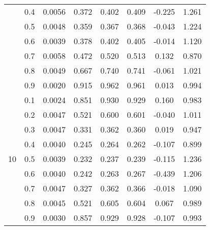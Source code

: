 \documentclass[11pt,a4paper]{report}
\begin{document}
\begin{longtable}{ | c | c || c | c | c | c | c | c | }
 & 0.4 & 0.0056 & 0.372 & 0.402 & 0.409 & -0.225 & 1.261 \\
 & 0.5 & 0.0048 & 0.359 & 0.367 & 0.368 & -0.043 & 1.224 \\
 & 0.6 & 0.0039 & 0.378 & 0.402 & 0.405 & -0.014 & 1.120 \\
 & 0.7 & 0.0058 & 0.472 & 0.520 & 0.513 & 0.132 & 0.870 \\
 & 0.8 & 0.0049 & 0.667 & 0.740 & 0.741 & -0.061 & 1.021 \\
 & 0.9 & 0.0020 & 0.915 & 0.962 & 0.961 & 0.013 & 0.994 \\
 \hline
\multirow{9}{*}{10} & 0.1 & 0.0024 & 0.851 & 0.930 & 0.929 & 0.160 & 0.983 \\
 & 0.2 & 0.0047 & 0.521 & 0.600 & 0.601 & -0.040 & 1.011 \\
 & 0.3 & 0.0047 & 0.331 & 0.362 & 0.360 & 0.019 & 0.947 \\
 & 0.4 & 0.0040 & 0.245 & 0.264 & 0.262 & -0.107 & 0.899 \\
 & 0.5 & 0.0039 & 0.232 & 0.237 & 0.239 & -0.115 & 1.236 \\
 & 0.6 & 0.0040 & 0.242 & 0.263 & 0.267 & -0.439 & 1.206 \\
 & 0.7 & 0.0047 & 0.327 & 0.362 & 0.366 & -0.018 & 1.090 \\
 & 0.8 & 0.0045 & 0.521 & 0.605 & 0.604 & 0.067 & 0.989 \\
 & 0.9 & 0.0030 & 0.857 & 0.929 & 0.928 & -0.107 & 0.993 \\
 \hline
\hline
\end{longtable}
\end{document}
